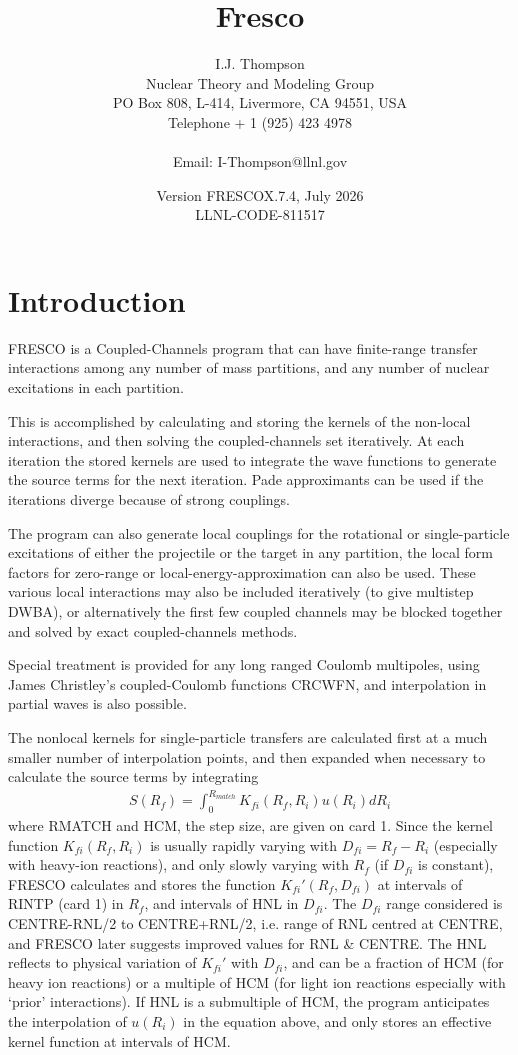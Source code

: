 \documentclass[11pt]{article}
\title{\Huge Fresco}
\date{Version FRESCOX.7.4, July 2026\\ LLNL-CODE-811517 }
\author{I.J. Thompson
%
\\Nuclear Theory and Modeling Group
\\PO Box 808, L-414,
 Livermore, CA 94551, USA
\\Telephone + 1 (925) 423 4978
\\ %
\\Email: I-Thompson@llnl.gov}
\newcommand{\beqn}{\begin{eqnarray*}}
\newcommand{\eeqn}{\end{eqnarray*}}
\begin{document}
\maketitle
\section{Introduction}

{\large
\parskip 5pt
\parindent 10pt

FRESCO is a Coupled-Channels program that can have finite-range
transfer interactions among any number of mass partitions, and any
number of nuclear excitations in each partition.

This is accomplished by calculating and storing the kernels of the
non-local interactions, and then solving the coupled-channels set
iteratively.
At each iteration the stored kernels are used to integrate the wave
functions to generate the source terms for the next iteration.
Pade approximants can be used if the iterations diverge because of
strong couplings.

The program can also generate local couplings for the rotational
or single-particle excitations of either the projectile or the
target in any partition,
the local form factors for zero-range or local-energy-approximation
can also be used.
These various local interactions may also be included iteratively
(to give multistep DWBA), or alternatively the first few coupled
channels may be blocked together and solved by exact coupled-channels
methods.

Special treatment is provided for any long ranged Coulomb multipoles,
using James Christley's coupled-Coulomb functions CRCWFN,
and interpolation in partial waves is also possible.

The nonlocal kernels for single-particle transfers are calculated first
at a much smaller number of interpolation points,
and then expanded when necessary to calculate the source terms by
integrating
\beqn
S(R _ f ) = \int _ 0 ^ {R _ {match}}
                K _ {fi} (R _ f , R _ i ) u(R _ i ) dR _ i
\eeqn
where RMATCH and HCM, the step size, are given on card 1.
Since the kernel function $K_{fi}(R_f,R_i)$ is usually rapidly varying with
$D_{fi} = R_{f} - R_{i}$ (especially with heavy-ion reactions), and only slowly
varying with $R_{f}$ (if $D_{fi}$ is constant),  FRESCO calculates and stores
the function $K_{fi}'(R_{f},D_{fi})$ at intervals of RINTP (card 1) in $R_{f}$,
and intervals of HNL in $D_{fi}$. The $D_{fi}$ range considered is
CENTRE-RNL/2 to CENTRE+RNL/2, i.e. range of RNL centred at CENTRE,
and FRESCO later suggests improved values for RNL \& CENTRE.
The HNL reflects to physical variation of $K_{fi}'$ with $D_{fi}$, and can be
a fraction of HCM (for heavy ion reactions) or a multiple of HCM
(for light ion reactions especially with `prior' interactions).
If HNL is a submultiple of HCM, the program anticipates the interpolation
of $u(R_{i})$ in the equation above, and only stores an effective kernel
function at intervals of HCM.

}
\end{document}
